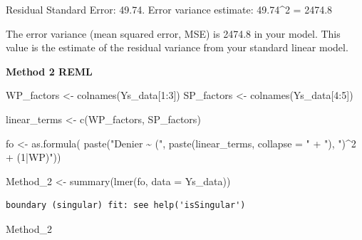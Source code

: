 \documentclass[
  letterpaper,
  DIV=11,
  numbers=noendperiod]{scrartcl}
\newenvironment{Shaded}{\begin{snugshade}}{\end{snugshade}}
\newcommand{\AttributeTok}[1]{\textcolor[rgb]{0.40,0.45,0.13}{#1}}
\newcommand{\DecValTok}[1]{\textcolor[rgb]{0.68,0.00,0.00}{#1}}
\newcommand{\FunctionTok}[1]{\textcolor[rgb]{0.28,0.35,0.67}{#1}}
\newcommand{\NormalTok}[1]{\textcolor[rgb]{0.00,0.23,0.31}{#1}}
\newcommand{\OtherTok}[1]{\textcolor[rgb]{0.00,0.23,0.31}{#1}}
\newcommand{\SpecialCharTok}[1]{\textcolor[rgb]{0.37,0.37,0.37}{#1}}
\newcommand{\StringTok}[1]{\textcolor[rgb]{0.13,0.47,0.30}{#1}}
\begin{document}
Residual Standard Error: 49.74. Error variance estimate: 49.74\^{}2 =
2474.8

The error variance (mean squared error, MSE) is 2474.8 in your model.
This value is the estimate of the residual variance from your standard
linear model.

\textbf{Method 2 REML}

\begin{Shaded}
\begin{Highlighting}[]
\NormalTok{WP\_factors }\OtherTok{\textless{}{-}} \FunctionTok{colnames}\NormalTok{(Ys\_data[}\DecValTok{1}\SpecialCharTok{:}\DecValTok{3}\NormalTok{])}
\NormalTok{SP\_factors }\OtherTok{\textless{}{-}} \FunctionTok{colnames}\NormalTok{(Ys\_data[}\DecValTok{4}\SpecialCharTok{:}\DecValTok{5}\NormalTok{])}

\NormalTok{linear\_terms }\OtherTok{\textless{}{-}} \FunctionTok{c}\NormalTok{(WP\_factors, SP\_factors)}

\NormalTok{fo }\OtherTok{\textless{}{-}} \FunctionTok{as.formula}\NormalTok{(}
  \FunctionTok{paste}\NormalTok{(}\StringTok{"Denier \textasciitilde{} ("}\NormalTok{, }\FunctionTok{paste}\NormalTok{(linear\_terms, }\AttributeTok{collapse =} \StringTok{" + "}\NormalTok{), }\StringTok{")\^{}2 + (1|WP)"}\NormalTok{))}

\NormalTok{Method\_2 }\OtherTok{\textless{}{-}} \FunctionTok{summary}\NormalTok{(}\FunctionTok{lmer}\NormalTok{(fo, }\AttributeTok{data =}\NormalTok{ Ys\_data))}
\end{Highlighting}
\end{Shaded}

\begin{verbatim}
boundary (singular) fit: see help('isSingular')
\end{verbatim}

\begin{Shaded}
\begin{Highlighting}[]
\NormalTok{Method\_2}
\end{Highlighting}
\end{Shaded}
\end{document}
